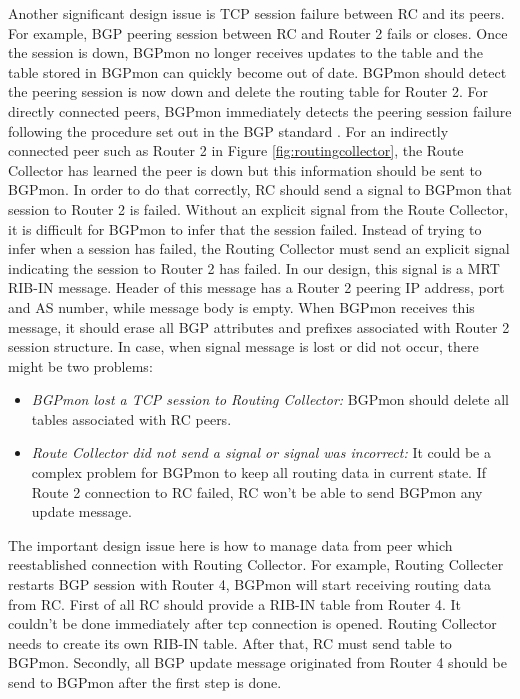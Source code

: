 Another significant design issue is TCP session failure between RC and its peers. For example, BGP peering session between RC and Router 2 fails or closes. Once the session is down,  BGPmon no longer receives updates to the table and the table stored in BGPmon can quickly become out of date.  BGPmon should detect the peering session is now down and delete the routing table for Router 2. For directly connected peers, BGPmon immediately detects the peering session failure following the procedure set out in the BGP standard \cite{bgprfc}. For an indirectly connected peer such as Router 2 in Figure \ref{fig:routingcollector}, the Route Collector has learned the peer is down but this information should be sent to BGPmon. 
In order to do that correctly, RC should send a signal to BGPmon that session to Router 2 is failed. Without an explicit signal from the Route Collector, it is difficult for BGPmon to infer that the session failed.
Instead of trying to infer when a session has failed,  the Routing Collector must send an explicit signal indicating the session to Router 2 has failed. In our design, this signal is a MRT RIB-IN message. Header of this message has a Router 2 peering IP address, port and AS number, while message body is empty. When BGPmon receives this message, it should erase all BGP attributes and prefixes associated with Router 2 session structure.
In case, when signal message is lost or did not occur, there might be two problems:
\begin{itemize}
\item{\emph{BGPmon lost a TCP session to Routing Collector:} BGPmon should delete all tables associated with RC peers.}
\item{\emph{Route Collector did not send a signal or signal was incorrect:} It could be a complex problem for BGPmon to keep all routing data in current state. If Route 2 connection to RC failed, RC won't be able to send BGPmon any update message.}
\end{itemize}

The important design issue here is how to manage data from peer which reestablished connection with Routing Collector. For example, Routing Collecter restarts BGP session with Router 4, BGPmon will start receiving routing data from RC. First of all RC should provide a RIB-IN table from Router 4. It couldn't be done immediately after tcp connection is opened. Routing Collector needs to create its own RIB-IN table. After that, RC must send table to BGPmon. Secondly, all BGP update message originated from Router 4 should be send to BGPmon after the first step is done. 

